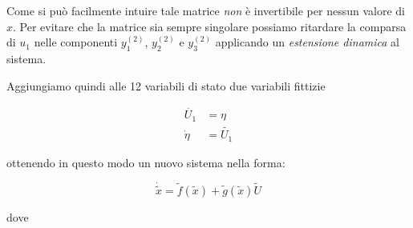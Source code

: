 \documentclass[a4paper,10pt]{article}
\begin{document}
Come si può facilmente intuire tale matrice \emph{non} è invertibile per nessun valore di $x$. Per evitare che la matrice sia sempre singolare possiamo ritardare la comparsa di $u_1$ nelle componenti $y^{(2)}_1$, $y^{(2)}_2$ e $y^{(2)}_3$ applicando un \emph{estensione dinamica} al sistema.

Aggiungiamo quindi alle 12 variabili di stato due variabili fittizie 

\begin{equation}
\begin{split}
\dot{U_1} &= \eta \\
\dot{\eta} &= \tilde{U_1}
\end{split}
\end{equation}

ottenendo in questo modo un nuovo sistema nella forma:

\begin{equation}
\dot{\tilde{x}}=\tilde{f}(\tilde{x})+\tilde{g}(\tilde{x})\tilde{U}
\end{equation}

dove
\end{document}
